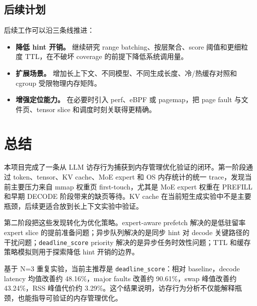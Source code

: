 \documentclass[a4paper]{article}
\begin{document}
\subsection{后续计划}

后续工作可以沿三条线推进：

\begin{itemize}
    \item \textbf{降低 hint 开销。} 继续研究 range batching、按层聚合、score 阈值和更细粒度 TTL，在不破坏 coverage 的前提下降低系统调用量。
    \item \textbf{扩展场景。} 增加长上下文、不同模型、不同生成长度、冷/热缓存对照和 cgroup 受限物理内存矩阵。
    \item \textbf{增强定位能力。} 在必要时引入 perf、eBPF 或 pagemap，把 page fault 与文件页、tensor slice 和调度时刻关联得更精确。
\end{itemize}

\section{总结}

本项目完成了一条从 LLM 访存行为捕获到内存管理优化验证的闭环。第一阶段通过 token、tensor、KV cache、MoE expert 和 OS 内存统计的统一 trace，发现当前主要压力来自 mmap 权重页 first-touch，尤其是 MoE expert 权重在 PREFILL 和早期 DECODE 阶段带来的缺页等待。KV cache 在当前短生成实验中不是主要瓶颈，后续更适合放到长上下文实验中验证。

第二阶段把这些发现转化为优化策略。expert-aware prefetch 解决的是低驻留率 expert slice 的提前准备问题；异步队列解决的是同步 hint 对 decode 关键路径的干扰问题；\texttt{deadline\_score} priority 解决的是异步任务时效性问题；TTL 和缓存策略模拟则用于探索降低 hint 开销的边界。

基于 N=3 重复实验，当前主推荐是 \texttt{deadline\_score}：相对 baseline，decode latency 均值改善约 48.16\%，major faults 改善约 90.61\%，swap 峰值改善约 43.24\%，RSS 峰值代价约 3.29\%。这个结果说明，访存行为分析不仅能解释瓶颈，也能指导可验证的内存管理优化。
\end{document}
